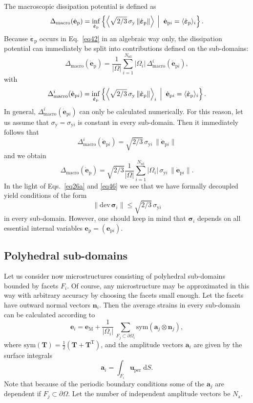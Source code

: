 \documentclass[final,1p,times]{elsarticle}
\newcommand{\bfsigma}{\boldsymbol{\sigma}}
\newcommand{\dbepsp}{\dot{\boldsymbol{\varepsilon}}_\mathrm{p}}
\newcommand{\sigy}{\sigma_\mathrm{y}}
\newcommand{\sigyi}{\sigma_{\mathrm{y}i}}
\newcommand{\be}{\begin{equation}}
\newcommand{\ee}{\end{equation}}
\newcommand{\bfm}[1]{ \mathbf{#1} }
\def\dd{\;\!\mathrm{d}}
\def\dev{\mathrm{dev}}
\def\sym{\mathrm{sym}}
\renewcommand{\inf}[3]{
\underset{#1}{\mathrm{inf}}\left\lbrace #2 \; \left| \vphantom{#2}\vphantom{#3} \right. \; #3 \right\rbrace
}
\begin{document}
The macroscopic dissipation potential is defined as
\be
\label{eq42}
\Delta_\mathrm{macro}(\dot{\bfm{e}}_{\mathrm{p}}) = 
\inf{\dbepsp}{\left\langle\sqrt{2/3} \, \sigy  \left\| \dbepsp \right\| \right\rangle}{ \dot{\bfm{e}}_{\mathrm{p}i} =  \langle \dbepsp \rangle_i }.
\ee
Because $\dbepsp$ occurs in Eq.\  \eqref{eq42} in an algebraic way only, the dissipation potential can immediately be split into contributions defined on the sub-domains:
\be
\label{eq43}
\Delta_\mathrm{macro}(\dot{\bfm{e}}_{\mathrm{p}}) = \frac{1}{|\Omega|} \sum_{i=1}^{N_\mathrm{sd}} |\Omega_i| \, \Delta_\mathrm{macro}^i(\dot{\bfm{e}}_{\mathrm{p}i}),
\ee
with
\be
\label{eq44}
\Delta_\mathrm{macro}^i(\dot{\bfm{e}}_{\mathrm{p}i}) = 
\inf{\dbepsp}{\left\langle\sqrt{2/3} \, \sigy  \left\| \dbepsp \right\| \right\rangle_i}{ \dot{\bfm{e}}_{\mathrm{p}i} =  \langle \dbepsp \rangle_i }.
\ee
In general, $\Delta_\mathrm{macro}^i(\dot{\bfm{e}}_{\mathrm{p}i})$ can only be calculated numerically. For this reason, let us assume that $\sigy = \sigyi$ is constant in every sub-domain. Then it immediately follows that
\be
\label{eq45}
\Delta_\mathrm{macro}^i(\dot{\bfm{e}}_{\mathrm{p}i}) = \sqrt{2/3} \,\sigyi \, \|\dot{\bfm{e}}_{\mathrm{p}i}\|
\ee
and we obtain
\be
\label{eq46}
\Delta_\mathrm{macro}(\dot{\bfm{e}}_{\mathrm{p}}) = \sqrt{2/3} \frac{1}{|\Omega|} \sum_{i=1}^{N_\mathrm{sd}} |\Omega_i| \, \sigyi \, \|\dot{\bfm{e}}_{\mathrm{p}i}\|.
\ee
In the light of Eqs.\  \eqref{eq26a} and \eqref{eq46} we see that we have formally decoupled yield conditions of the form
\be
\label{eq47}
\| \dev \,\bfsigma_i \| \leq \sqrt{2/3} \, \sigyi
\ee
in every sub-domain. However, one should keep in mind that $\bfsigma_i$ depends on all essential internal variables $\bfm{e}_{\mathrm{p}} = \left( \bfm{e}_{\mathrm{p}i}  \right)$.

\subsection{Polyhedral sub-domains}

Let us consider now microstructures consisting of polyhedral sub-domains bounded by facets $F_i$. Of course, any microstructure may be approximated in this way with arbitrary accuracy by choosing the facets small enough. Let the facets have outward normal vectors $\bfm{n}_i$. Then the average strains in every sub-domain can be calculated according to
\be
\label{eq48}
\bfm{e}_i = \bfm{e}_\mathrm{M} + \frac{1}{|\Omega_i|} \, \sum_{F_j \subset \partial\Omega_i} \sym  (\bfm{a}_j \otimes \bfm{n}_j),
\ee
where $\sym(\bfm{T})=\frac{1}{2}(\bfm{T}+\bfm{T}^\mathrm{T})$, and the amplitude vectors $\bfm{a}_i$ are given by the surface integrals
\be
\label{eq49}
\bfm{a}_i = \int_{F_i} \bfm{u}_\mathrm{per} \dd S.
\ee
Note that because of the periodic boundary conditions some of the $\bfm{a}_j$ are dependent if $F_j \subset \partial\Omega$. Let the number of independent amplitude vectors be $N_\mathrm{a}$. 
\end{document}
